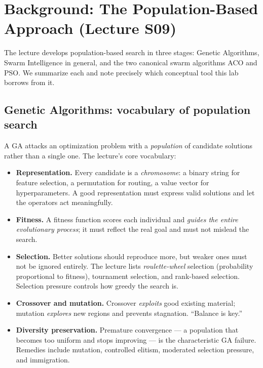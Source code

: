 \documentclass[11pt,a4paper]{article}
\begin{document}
\section{Background: The Population-Based Approach (Lecture S09)}

The lecture develops population-based search in three stages: Genetic Algorithms, Swarm
Intelligence in general, and the two canonical swarm algorithms ACO and PSO. We summarize each
and note precisely which conceptual tool this lab borrows from it.

\subsection{Genetic Algorithms: vocabulary of population search}

A GA attacks an optimization problem with a \emph{population} of candidate solutions rather than
a single one. The lecture's core vocabulary:

\begin{itemize}[itemsep=2pt]
  \item \textbf{Representation.} Every candidate is a \emph{chromosome}: a binary string for
        feature selection, a permutation for routing, a value vector for hyperparameters. A good
        representation must express valid solutions and let the operators act meaningfully.
  \item \textbf{Fitness.} A fitness function scores each individual and \emph{guides the entire
        evolutionary process}; it must reflect the real goal and must not mislead the search.
  \item \textbf{Selection.} Better solutions should reproduce more, but weaker ones must not be
        ignored entirely. The lecture lists \emph{roulette-wheel} selection (probability
        proportional to fitness), tournament selection, and rank-based selection. Selection
        pressure controls how greedy the search is.
  \item \textbf{Crossover and mutation.} Crossover \emph{exploits} good existing material;
        mutation \emph{explores} new regions and prevents stagnation. ``Balance is key.''
  \item \textbf{Diversity preservation.} Premature convergence --- a population that becomes too
        uniform and stops improving --- is the characteristic GA failure. Remedies include
        mutation, controlled elitism, moderated selection pressure, and immigration.
\end{itemize}
\end{document}
